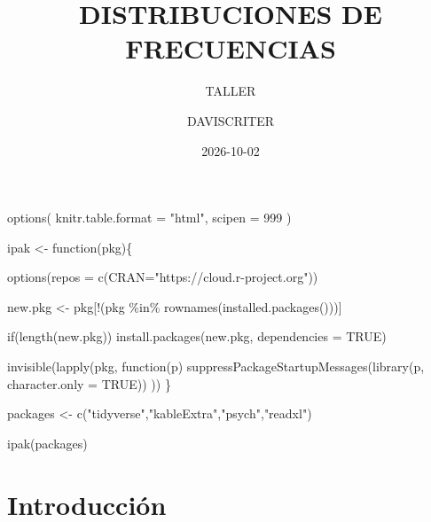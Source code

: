 \documentclass[
  spanish,
  14pt,
  letterpaper,
  DIV=11,
  numbers=noendperiod]{scrartcl}
\title{DISTRIBUCIONES DE FRECUENCIAS}
\subtitle{TALLER}
\author{DAVISCRITER}
\date{2026-10-02}
\newenvironment{Shaded}{\begin{snugshade}}{\end{snugshade}}
\newcommand{\AttributeTok}[1]{\textcolor[rgb]{0.98,0.15,0.45}{#1}}
\newcommand{\ConstantTok}[1]{\textcolor[rgb]{0.68,0.51,1.00}{#1}}
\newcommand{\ControlFlowTok}[1]{\textcolor[rgb]{0.98,0.15,0.45}{#1}}
\newcommand{\DecValTok}[1]{\textcolor[rgb]{0.68,0.51,1.00}{#1}}
\newcommand{\FunctionTok}[1]{\textcolor[rgb]{0.65,0.89,0.18}{#1}}
\newcommand{\NormalTok}[1]{\textcolor[rgb]{0.97,0.97,0.95}{#1}}
\newcommand{\OtherTok}[1]{\textcolor[rgb]{0.65,0.89,0.18}{#1}}
\newcommand{\SpecialCharTok}[1]{\textcolor[rgb]{0.68,0.51,1.00}{#1}}
\newcommand{\StringTok}[1]{\textcolor[rgb]{0.90,0.86,0.45}{#1}}
\renewcommand*\contentsname{Tabla de contenidos}
\newcommand\contentsname{Tabla de contenidos}
\begin{document}
\maketitle

\renewcommand*\contentsname{Tabla de contenidos}
{
\setcounter{tocdepth}{3}
\tableofcontents
}

\begin{Shaded}
\begin{Highlighting}[]
\FunctionTok{options}\NormalTok{(}
  \AttributeTok{knitr.table.format =} \StringTok{"html"}\NormalTok{,}
  \AttributeTok{scipen =} \DecValTok{999}
\NormalTok{)}
\end{Highlighting}
\end{Shaded}

\begin{Shaded}
\begin{Highlighting}[]
\NormalTok{ipak }\OtherTok{\textless{}{-}} \ControlFlowTok{function}\NormalTok{(pkg)\{}

  \FunctionTok{options}\NormalTok{(}\AttributeTok{repos =} \FunctionTok{c}\NormalTok{(}\AttributeTok{CRAN=}\StringTok{"https://cloud.r{-}project.org"}\NormalTok{))}

\NormalTok{  new.pkg }\OtherTok{\textless{}{-}}\NormalTok{ pkg[}\SpecialCharTok{!}\NormalTok{(pkg }\SpecialCharTok{\%in\%} \FunctionTok{rownames}\NormalTok{(}\FunctionTok{installed.packages}\NormalTok{()))]}

  \ControlFlowTok{if}\NormalTok{(}\FunctionTok{length}\NormalTok{(new.pkg)) }\FunctionTok{install.packages}\NormalTok{(new.pkg, }\AttributeTok{dependencies =} \ConstantTok{TRUE}\NormalTok{)}

  \FunctionTok{invisible}\NormalTok{(}\FunctionTok{lapply}\NormalTok{(pkg, }\ControlFlowTok{function}\NormalTok{(p)}
    \FunctionTok{suppressPackageStartupMessages}\NormalTok{(}\FunctionTok{library}\NormalTok{(p, }\AttributeTok{character.only =} \ConstantTok{TRUE}\NormalTok{))}
\NormalTok{  ))}
\NormalTok{\}}

\NormalTok{packages }\OtherTok{\textless{}{-}} \FunctionTok{c}\NormalTok{(}\StringTok{"tidyverse"}\NormalTok{,}\StringTok{"kableExtra"}\NormalTok{,}\StringTok{"psych"}\NormalTok{,}\StringTok{"readxl"}\NormalTok{)}

\FunctionTok{ipak}\NormalTok{(packages)}
\end{Highlighting}
\end{Shaded}

\section{Introducción}\label{introducciuxf3n}
\end{document}
